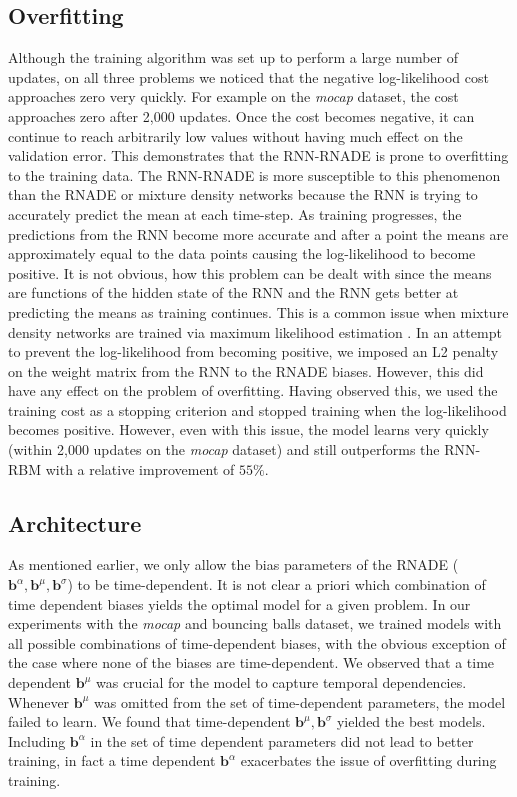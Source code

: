 \documentclass{article} %
\begin{document}
\subsection{Overfitting}
 Although the training algorithm was set up to perform a large number of updates, on all three problems we noticed that the negative log-likelihood cost approaches zero very quickly. For example on the \textit{mocap} dataset, the cost approaches zero after 2,000 updates. Once the cost becomes negative, it can continue to reach arbitrarily low values without having much effect on the validation error. This demonstrates that the RNN-RNADE is prone to overfitting to the training data. The RNN-RNADE is more susceptible to this phenomenon than the RNADE or mixture density networks because the RNN is trying to accurately predict the mean at each time-step. As training progresses, the predictions from the RNN become more accurate and after a point the means are approximately equal to the data points causing the log-likelihood to become positive. It is not obvious, how this problem can be dealt with since the means are functions of the hidden state of the RNN and the RNN gets better at predicting the means as training continues. This is a common issue when mixture density networks are trained via maximum likelihood estimation \cite{bishop2006pattern}. In an attempt to prevent the log-likelihood from becoming positive, we imposed an L2 penalty on the weight matrix from the RNN to the RNADE biases. However, this did have any effect on the problem of overfitting. Having observed this, we used the training cost as a stopping criterion and stopped training when the log-likelihood becomes positive. However, even with this issue, the model learns very quickly (within 2,000 updates on the \textit{mocap} dataset) and still outperforms the RNN-RBM with a relative improvement of $55\%$. 

\subsection{Architecture}

As mentioned earlier, we only allow the bias parameters of the RNADE ($\mathbf{b}^{\alpha},\mathbf{b}^{\mu},\mathbf{b}^{\sigma}$) to be time-dependent. It is not clear a priori which combination of time dependent biases yields the optimal model for a given problem. In our experiments with the \textit{mocap} and bouncing balls dataset, we trained models with all possible combinations of time-dependent biases, with the obvious exception of the case where none of the biases are time-dependent. We observed that a time dependent $\mathbf{b}^{\mu}$ was crucial for the model to capture temporal dependencies. Whenever $\mathbf{b}^{\mu}$ was omitted from the set of time-dependent parameters, the model failed to learn. We found that time-dependent $\mathbf{b}^{\mu},\mathbf{b}^{\sigma}$ yielded the best models. Including $\mathbf{b}^{\alpha}$ in the set of time dependent parameters did not lead to better training, in fact a time dependent $\mathbf{b}^{\alpha}$ exacerbates the issue of overfitting during training. 
\end{document}
